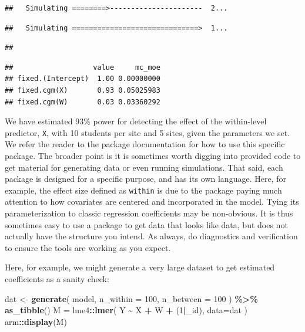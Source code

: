 \documentclass[
]{book}
\newenvironment{Shaded}{\begin{snugshade}}{\end{snugshade}}
\newcommand{\AttributeTok}[1]{\textcolor[rgb]{0.13,0.29,0.53}{#1}}
\newcommand{\DecValTok}[1]{\textcolor[rgb]{0.00,0.00,0.81}{#1}}
\newcommand{\FunctionTok}[1]{\textcolor[rgb]{0.13,0.29,0.53}{\textbf{#1}}}
\newcommand{\NormalTok}[1]{#1}
\newcommand{\OtherTok}[1]{\textcolor[rgb]{0.56,0.35,0.01}{#1}}
\newcommand{\SpecialCharTok}[1]{\textcolor[rgb]{0.81,0.36,0.00}{\textbf{#1}}}
\newcommand{\StringTok}[1]{\textcolor[rgb]{0.31,0.60,0.02}{#1}}
\begin{document}
\begin{verbatim}
##   Simulating ========>----------------------  2...
\end{verbatim}

\begin{verbatim}
##   Simulating ==============================>  1...
\end{verbatim}

\begin{verbatim}
## 
\end{verbatim}

\begin{verbatim}
##                   value     mc_moe
## fixed.(Intercept)  1.00 0.00000000
## fixed.cgm(X)       0.93 0.05025983
## fixed.cgm(W)       0.03 0.03360292
\end{verbatim}

We have estimated 93\% power for detecting the effect of the within-level predictor, \texttt{X}, with 10 students per site and 5 sites, given the parameters we set.
We refer the reader to the package documentation for how to use this specific package.
The broader point is it is sometimes worth digging into provided code to get material for generating data or even running simulations.
That said, each package is designed for a specific purpose, and has its own language.
Here, for example, the effect size defined as \texttt{within} is due to the package paying much attention to how covariates are centered and incorporated in the model.
Tying its parameterization to classic regression coefficients may be non-obvious.
It is thus sometimes easy to use a package to get data that looks like data, but does not actually have the structure you intend.
As always, do diagnostics and verification to ensure the tools are working as you expect.

Here, for example, we might generate a very large dataset to get estimated coefficients as a sanity check:

\begin{Shaded}
\begin{Highlighting}[]
\NormalTok{dat }\OtherTok{\textless{}{-}} \FunctionTok{generate}\NormalTok{( model, }
                 \AttributeTok{n\_within =} \DecValTok{100}\NormalTok{, }
                 \AttributeTok{n\_between =} \DecValTok{100}\NormalTok{ ) }\SpecialCharTok{\%\textgreater{}\%}
  \FunctionTok{as\_tibble}\NormalTok{()}
\NormalTok{M }\OtherTok{=}\NormalTok{ lme4}\SpecialCharTok{::}\FunctionTok{lmer}\NormalTok{( Y }\SpecialCharTok{\textasciitilde{}}\NormalTok{ X }\SpecialCharTok{+}\NormalTok{ W }\SpecialCharTok{+}\NormalTok{ (}\DecValTok{1}\SpecialCharTok{|}\StringTok{\textasciigrave{}}\AttributeTok{\_id}\StringTok{\textasciigrave{}}\NormalTok{), }\AttributeTok{data=}\NormalTok{dat )}
\NormalTok{arm}\SpecialCharTok{::}\FunctionTok{display}\NormalTok{(M)}
\end{Highlighting}
\end{Shaded}
\end{document}
